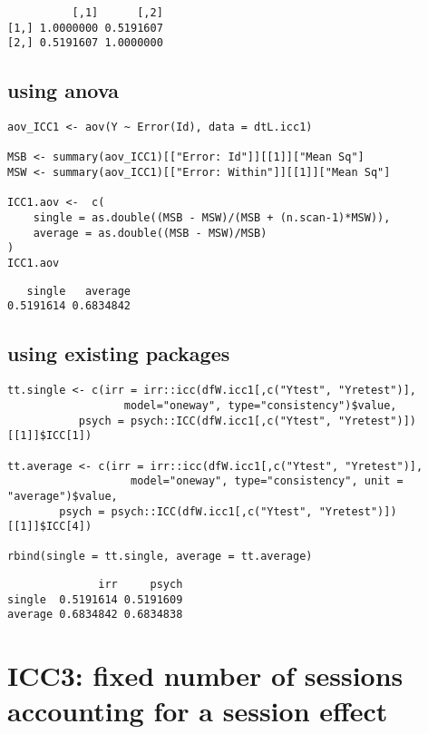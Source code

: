 \documentclass[12pt]{article}
\begin{document}
\begin{verbatim}
          [,1]      [,2]
[1,] 1.0000000 0.5191607
[2,] 0.5191607 1.0000000
\end{verbatim}

\subsection{using anova}
\label{sec:org3a76f51}
\lstset{language=r,label= ,caption= ,captionpos=b,numbers=none}
\begin{lstlisting}
aov_ICC1 <- aov(Y ~ Error(Id), data = dtL.icc1) 

MSB <- summary(aov_ICC1)[["Error: Id"]][[1]]["Mean Sq"]
MSW <- summary(aov_ICC1)[["Error: Within"]][[1]]["Mean Sq"]

ICC1.aov <-  c(
    single = as.double((MSB - MSW)/(MSB + (n.scan-1)*MSW)),
    average = as.double((MSB - MSW)/MSB)
)
ICC1.aov
\end{lstlisting}

\begin{verbatim}
   single   average 
0.5191614 0.6834842
\end{verbatim}

\subsection{using existing packages}
\label{sec:orge0de3a2}
\lstset{language=r,label= ,caption= ,captionpos=b,numbers=none}
\begin{lstlisting}
tt.single <- c(irr = irr::icc(dfW.icc1[,c("Ytest", "Yretest")],
			      model="oneway", type="consistency")$value,
	       psych = psych::ICC(dfW.icc1[,c("Ytest", "Yretest")])[[1]]$ICC[1])

tt.average <- c(irr = irr::icc(dfW.icc1[,c("Ytest", "Yretest")],
			       model="oneway", type="consistency", unit = "average")$value,
		psych = psych::ICC(dfW.icc1[,c("Ytest", "Yretest")])[[1]]$ICC[4])

rbind(single = tt.single, average = tt.average)
\end{lstlisting}

\begin{verbatim}
              irr     psych
single  0.5191614 0.5191609
average 0.6834842 0.6834838
\end{verbatim}

\clearpage

\section{ICC3: fixed number of sessions accounting for a session effect}
\label{sec:org836ea13}
\end{document}
